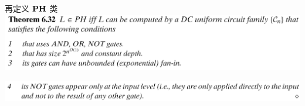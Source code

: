 \documentclass[UTF8,aspectratio=169,mathserif]{beamer}
\begin{document}
	\begin{frame}{再定义 $\bf PH$ 类}
		\includegraphics[width=\linewidth]{../../5 & 6/note.assets/image-20210427192410944.png}
		
		\includegraphics[width=\linewidth]{../../5 & 6/note.assets/image-20210427192420565.png}\newline
		
	\end{frame}
	
\end{document}
